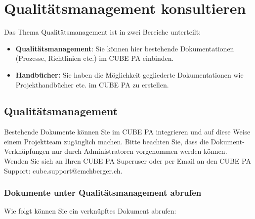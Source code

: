 
\pagebreak
\section{Qualitätsmanagement konsultieren}

Das Thema Qualitätsmanagement ist in zwei Bereiche unterteilt: 

\vspace{\baselineskip}

\begin{itemize}
\item
\textbf{Qualitätsmanagement}: Sie können hier bestehende Dokumentationen (Prozesse, Richtlinien etc.) im CUBE PA einbinden.
\item
\textbf{Handbücher: }Sie haben die Möglichkeit gegliederte Dokumentationen wie Projekthandbücher etc. im CUBE PA zu erstellen.
\end{itemize}

\vspace{\baselineskip}

\subsection{Qualitätsmanagement}

Bestehende Dokumente können Sie im CUBE PA integrieren und auf diese Weise einem Projektteam zugänglich machen. Bitte beachten Sie, dass die Dokument-Verknüpfungen nur durch Administratoren vorgenommen werden können. Wenden Sie sich an Ihren CUBE PA Superuser oder per Email an den CUBE PA Support: {\color{red} cube.support@emchberger.ch}.

\subsubsection{Dokumente unter Qualitätsmanagement abrufen}

Wie folgt können Sie ein verknüpftes Dokument abrufen:

\vspace{\baselineskip}


